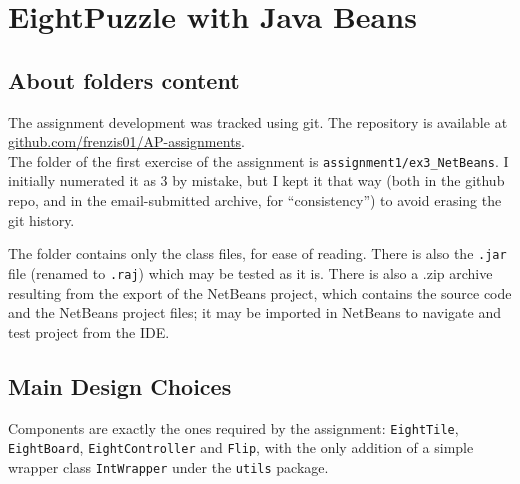 \chapter{EightPuzzle with Java Beans}

\section{About folders content}

The assignment development was tracked using git. The repository is available at \href{https://github.com/frenzis01/AP-assignments}{github.com/frenzis01/AP-assignments}.\\
The folder of the first exercise of the assignment is \texttt{assignment1/ex3\_NetBeans}. 
I initially numerated it as 3 by mistake, but I kept it that way (both in the github repo, and in the email-submitted archive, for ``consistency'') to avoid erasing the git history.

The folder contains only the class files, for ease of reading.
There is also the \texttt{.jar} file (renamed to \texttt{.raj}) which may be tested as it is.
There is also a .zip archive resulting from the export of the NetBeans project, which contains the source code and the NetBeans project files; it may be imported in NetBeans to navigate and test project from the IDE.


\section{Main Design Choices}

Components are exactly the ones required by the assignment: \lstinline|EightTile|, \lstinline|EightBoard|, \lstinline|EightController| and \lstinline|Flip|, with the only addition of a simple wrapper class \lstinline|IntWrapper| under the \lstinline|utils| package.

